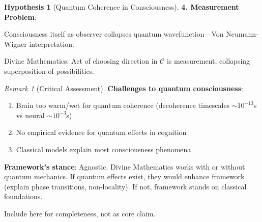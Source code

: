 \documentclass[11pt,a4paper]{article}
\theoremstyle{definition}
\newtheorem{hypothesis}{Hypothesis}[section]
\theoremstyle{remark}
\newtheorem{remark}{Remark}[section]
\newcommand{\CC}{\mathcal{C}}
\newcommand{\cc}{\mathbf{c}}
\begin{document}
\begin{enumerate}
\begin{hypothesis}[Quantum Coherence in Consciousness]
\textbf{4. Measurement Problem}:

Consciousness itself as observer collapses quantum wavefunction—Von Neumann-Wigner interpretation.

Divine Mathematics: Act of choosing direction in \(\CC\) is measurement, collapsing superposition of possibilities.
\end{hypothesis}

\begin{remark}[Critical Assessment]
\textbf{Challenges to quantum consciousness}:
\begin{enumerate}
    \item Brain too warm/wet for quantum coherence (decoherence timescales \(\sim 10^{-13}\)s vs neural \(\sim 10^{-3}\)s)
    \item No empirical evidence for quantum effects in cognition
    \item Classical models explain most consciousness phenomena
\end{enumerate}

\textbf{Framework's stance}: Agnostic. Divine Mathematics works with or without quantum mechanics. If quantum effects exist, they would enhance framework (explain phase transitions, non-locality). If not, framework stands on classical foundations.

Include here for completeness, not as core claim.
\end{remark}

\begin{figure}[H]
\centering
{}
\end{figure}
\end{enumerate}
\end{document}
